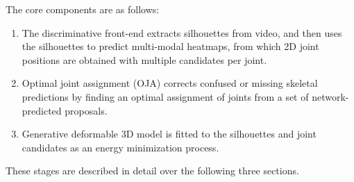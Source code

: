 The core components are as follows:

\begin{enumerate}
    \item The discriminative front-end extracts silhouettes from video, and then uses the silhouettes to predict multi-modal heatmaps, from which 2D joint positions are obtained with multiple candidates per joint. 
    \item Optimal joint assignment (OJA) corrects confused or missing skeletal predictions by finding an optimal assignment of joints from a set of network-predicted proposals. 
    \item Generative deformable 3D model is fitted to the silhouettes and joint candidates as an energy minimization process.
\end{enumerate}

These stages are described in detail over the following three sections.

